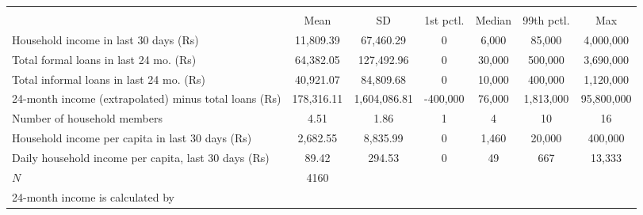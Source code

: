 {
\def\sym#1{\ifmmode^{#1}\else\(^{#1}\)\fi}
\begin{tabular}{l*{1}{cccccc}}
\hline\hline
            &\multicolumn{6}{c}{}                                                         \\
            &        Mean&          SD&   1st pctl.&      Median&  99th pctl.&         Max\\
\hline
Household income in last 30 days (Rs)&   11,809.39&   67,460.29&           0&       6,000&      85,000&   4,000,000\\
Total formal loans in last 24 mo. (Rs)&   64,382.05&  127,492.96&           0&      30,000&     500,000&   3,690,000\\
Total informal loans in last 24 mo. (Rs)&   40,921.07&   84,809.68&           0&      10,000&     400,000&   1,120,000\\
24-month income (extrapolated) minus total loans (Rs)&  178,316.11&1,604,086.81&    -400,000&      76,000&   1,813,000&  95,800,000\\
Number of household members&        4.51&        1.86&           1&           4&          10&          16\\
Household income per capita in last 30 days (Rs)&    2,682.55&    8,835.99&           0&       1,460&      20,000&     400,000\\
Daily household income per capita, last 30 days (Rs)&       89.42&      294.53&           0&          49&         667&      13,333\\
\hline
\(N\)       &        4160&            &            &            &            &            \\
\hline\hline
\multicolumn{7}{l}{\footnotesize 24-month income is calculated by }\\
\end{tabular}
}
